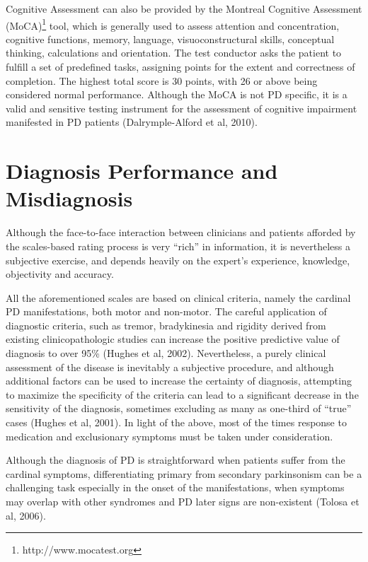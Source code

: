 Cognitive Assessment can also be provided by the Montreal Cognitive Assessment (\gls{MoCA})\footnote{http://www.mocatest.org} tool, which is generally used to assess attention and concentration, cognitive functions, memory, language, visuoconstructural skills, conceptual thinking, calculations and orientation. The test conductor asks the patient to fulfill a set of predefined tasks, assigning points for the extent and correctness of completion. The highest total score is 30 points, with 26 or above being considered normal performance. Although the \gls{MoCA} is not \gls{PD} specific, it is a valid and sensitive testing instrument for the assessment of cognitive impairment manifested in \gls{PD} patients (Dalrymple-Alford et al, 2010). 


\section{Diagnosis Performance and Misdiagnosis}
\label{sec:misdiagnosis}
Although the face-to-face interaction between clinicians and patients afforded by the scales-based rating process is very ``rich'' in information, it is nevertheless a subjective exercise, and depends heavily on the expert's experience, knowledge, objectivity and accuracy.

All the aforementioned scales are based on clinical criteria, namely the cardinal \gls{PD} manifestations, both motor and non-motor. The careful application of diagnostic criteria, such as tremor, bradykinesia and rigidity derived from existing clinicopathologic studies can increase the positive predictive value of diagnosis to over 95\% (Hughes et al, 2002). Nevertheless, a purely clinical assessment of the disease is inevitably a subjective procedure, and although additional factors can be used to increase the certainty of diagnosis, attempting to maximize the specificity of the criteria can lead to a significant decrease in the sensitivity of the diagnosis, sometimes excluding as many as one-third of ``true'' cases (Hughes et al, 2001). In light of the above, most of the times response to medication and exclusionary symptoms must be taken under consideration.

Although the diagnosis of \gls{PD} is straightforward when patients suffer from the cardinal symptoms, differentiating primary from secondary parkinsonism can be a challenging task especially in the onset of the manifestations, when symptoms may overlap with other syndromes and \gls{PD} later signs are non-existent (Tolosa et al, 2006).

